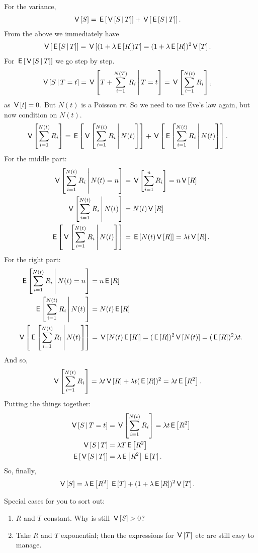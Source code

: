 \begin{exercise}
\begin{solution}
For the variance,
\begin{align}
\V S &= \E{\V{S\given T}} + \V{\E{S\given T}}.
\end{align}
From the above we immediately have
\begin{align}
\V{\E{S\given T}} &= \V{(1+\lambda \E R) T} = (1+\lambda\E R)^{2} \V T.
\end{align}
For $\E{\V{S\given T}}$ we go step  by step.
\begin{align}
\V{S\given T=t} &= \V{T + \sum_{i=1}^{N(T)} R_{i}\given T=t} = \V{\sum_{i=1}^{N(t)} R_{i}},
\end{align}
as $\V t = 0$. But $N(t)$ is a Poisson rv. So we need to use Eve's law again, but now condition on $N(t)$.
\begin{align}
\V{\sum_{i=1}^{N(t)} R_{i}} &= \E{\V{\sum_{i=1}^{N(t)} R_{i}\given N(t)}} + \V{\E{\sum_{i=1}^{N(t)} R_{i}\given N(t)}}.
\end{align}
For the middle part:
\begin{align}
\V{\sum_{i=1}^{N(t)} R_{i}\given N(t)=n} &= \V{\sum_{i=1}^{n} R_{i}}  = n \V R \\
\V{\sum_{i=1}^{N(t)} R_{i}\given N(t)} &= N(t) \V R \\
\E{\V{\sum_{i=1}^{N(t)} R_{i}\given N(t)}} &= \E{N(t) \V R}=  \lambda t \V R.
\end{align}
For the right part:
\begin{align}
\E{\sum_{i=1}^{N(t)} R_{i}\given N(t)=n} &= n \E R\\
\E{\sum_{i=1}^{N(t)} R_{i}\given N(t)} &= N(t) \E R\\
\V{\E{\sum_{i=1}^{N(t)} R_{i}\given N(t)}} &= \V{N(t)\E R} = (\E R)^{2} \V{N(t)} = (\E R)^{2} \lambda t.
\end{align}
And so,
\begin{align}
\V{\sum_{i=1}^{N(t)} R_{i}} &= \lambda t \V R  + \lambda t (\E R)^{2}  = \lambda t \E{R^{2}}.
\end{align}
Putting the things together:
\begin{align}
\V{S\given T=t} &= \V{\sum_{i=1}^{N(t)} R_{i}} = \lambda t \E{R^{2}}\\
\V{S\given T} &= \lambda T \E{R^{2}}\\
\E{\V{S\given T}} &= \lambda \E{R^{2}} \E T.
\end{align}
So, finally,
\begin{align}
\V S &= \lambda \E{R^{2}} \E T + (1+\lambda\E R)^{2} \V T.
\end{align}

Special cases for you to sort out:
\begin{enumerate}
\item  $R$ and $T$ constant. Why is still $\V S > 0$?
\item Take $R$ and $T$ exponential; then the expressions for $\V T$ etc are still easy to manage.
\end{enumerate}
\end{solution}
\end{exercise}


